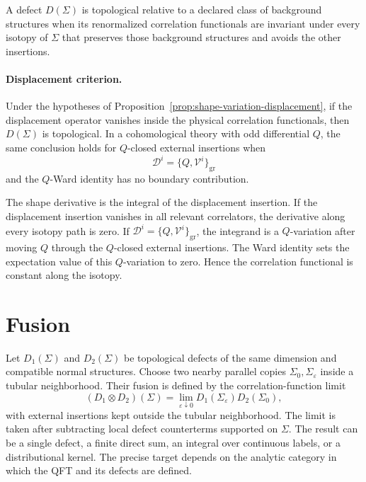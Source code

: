 \begin{definition}
\label{def:topological-defect}
A defect \(D(\Sigma)\) is topological relative to a declared class of
background structures when its renormalized correlation functionals are
invariant under every isotopy of \(\Sigma\) that preserves those background
structures and avoids the other insertions.
\end{definition}

\paragraph{Displacement criterion.}
Under the hypotheses of Proposition~\ref{prop:shape-variation-displacement},
if the displacement operator vanishes inside the physical correlation
functionals, then \(D(\Sigma)\) is topological.  In a cohomological theory
with odd differential \(Q\), the same conclusion holds for \(Q\)-closed
external insertions when
\[
  \mathcal D^i=\{Q,\mathcal V^i\}_{\mathrm{gr}}
\]
and the \(Q\)-Ward identity has no boundary contribution.

The shape derivative is the integral of the displacement insertion.  If the
displacement insertion vanishes in all relevant correlators, the derivative
along every isotopy path is zero.  If
\(\mathcal D^i=\{Q,\mathcal V^i\}_{\mathrm{gr}}\), the integrand is a
\(Q\)-variation after moving \(Q\) through the \(Q\)-closed external
insertions.  The Ward identity sets the expectation value of this
\(Q\)-variation to zero.  Hence the correlation functional is constant along
the isotopy.

\section{Fusion}

Let \(D_1(\Sigma)\) and \(D_2(\Sigma)\) be topological defects of the same
dimension and compatible normal structures.  Choose two nearby parallel
copies \(\Sigma_0,\Sigma_\varepsilon\) inside a tubular neighborhood.  Their
fusion is defined by the correlation-function limit
\[
  (D_1\otimes D_2)(\Sigma)
  =
  \lim_{\varepsilon\downarrow0}
  D_1(\Sigma_\varepsilon)D_2(\Sigma_0),
\]
with external insertions kept outside the tubular neighborhood.  The limit is
taken after subtracting local defect counterterms supported on \(\Sigma\).
The result can be a single defect, a finite direct sum, an integral over
continuous labels, or a distributional kernel.  The precise target depends on
the analytic category in which the QFT and its defects are defined.

